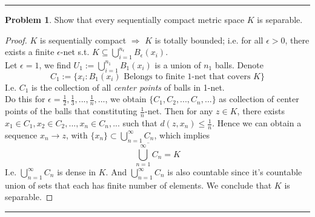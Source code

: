\documentclass[a4paper, 10pt]{article}
\theoremstyle{definition}
\newtheorem{problem}{Problem}
\theoremstyle{hSol}
\begin{document}
\noindent\rule{16cm}{0.4pt}

\begin{problem} Show that every sequentially compact metric space $K$ is separable.
\end{problem}
\begin{proof} $K$ is sequentially compact $\Rightarrow$ $K$ is totally bounded; i.e. for all $\epsilon>0$, there exists a finite $\epsilon$-net s.t. $K \subseteq \bigcup_{i=1}^{n_{\epsilon}} B_{\epsilon}(x_i)$.\\
Let $\epsilon=1$, we find $U_1:=\bigcup_{i=1}^{n_{1}} B_{1}(x_i)$ is a union of $n_1$ balls. Denote
$$C_1:=\{x_i: B_1(x_i) \text{ Belongs to finite 1-net that covers $K$}\}$$
I.e. $C_1$ is the collection of all \textit{center points} of balls in 1-net. \\
Do this for $\epsilon=\frac{1}{2}, \frac{1}{3}, ..., \frac{1}{n}, ...$, we obtain $\{C_1, C_2, ..., C_n, ...\}$ as collection of center points of the balls that constituting $\frac{1}{n}$-net. Then for any $z\in K$, there exists $x_1 \in C_1, x_2 \in C_2, ..., x_n \in C_n,...$ such that $d(z, x_n)\leq \frac{1}{n}$. Hence we can obtain a sequence $x_n \to z$, with $\{x_n\} \subset \bigcup_{n=1}^{\infty} C_n$, which implies
\begin{equation}
  \overline{\bigcup_{n=1}^{\infty} C_n} = K
\end{equation}
I.e. $\bigcup_{n=1}^{\infty} C_n$ is dense in $K$. And $\bigcup_{n=1}^{\infty} C_n$ is also countable since it's countable union of sets that each has finite number of elements. We conclude that $K$ is separable.
\end{proof}

\noindent\rule{16cm}{0.4pt}
\end{document}
